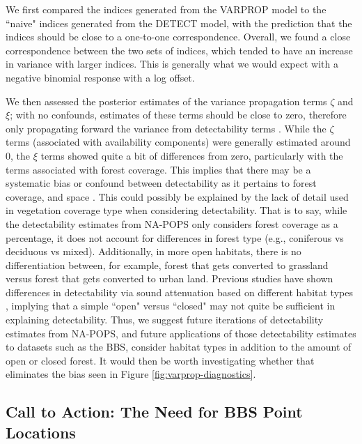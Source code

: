 We first compared the indices generated from the VARPROP model to the ``naive" indices generated from the DETECT model, with the prediction that the indices should be close to a one-to-one correspondence.
Overall, we found a close correspondence between the two sets of indices, which tended to have an increase in variance with larger indices.
This is generally what we would expect with a negative binomial response with a log offset.

We then assessed the posterior estimates of the variance propagation terms $\zeta$ and $\xi$; with no confounds, estimates of these terms should be close to zero, therefore only propagating forward the variance from detectability terms \citep{bravington_variance_2021}.
While the $\zeta$ terms (associated with availability components) were generally estimated around 0, the $\xi$ terms showed quite a bit of differences from zero, particularly with the terms associated with forest coverage.
This implies that there may be a systematic bias or confound between detectability as it pertains to forest coverage, and space \citep{bravington_variance_2021}.
This could possibly be explained by the lack of detail used in vegetation coverage type when considering detectability.
That is to say, while the detectability estimates from NA-POPS only considers forest coverage as a percentage, it does not account for differences in forest type (e.g., coniferous vs deciduous vs mixed).
Additionally, in more open habitats, there is no differentiation between, for example, forest that gets converted to grassland versus forest that gets converted to urban land.
Previous studies have shown differences in detectability via sound attenuation based on different habitat types \citep{schieck_biased_1997}, implying that a simple ``open" versus ``closed" may not quite be sufficient in explaining detectability.
Thus, we suggest future iterations of detectability estimates from NA-POPS, and future applications of those detectability estimates to datasets such as the BBS, consider habitat types in addition to the amount of open or closed forest.
It would then be worth investigating whether that eliminates the bias seen in Figure \ref{fig:varprop-diagnostics}.

\subsection{Call to Action: The Need for BBS Point Locations}

